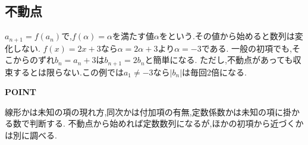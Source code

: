 \subsection{不動点}\label{節：不動点}
$a_{n+1}=f(a_n)$で,$f(\alpha)=\alpha$を満たす値$\alpha$を\textbf{}という.その値から始めると数列は変化しない.
$f(x)=2x+3$なら$\alpha=2\alpha+3$より$\alpha=-3$である.
一般の初項でも,そこからのずれ$b_n=a_n+3$は$b_{n+1}=2b_n$と簡単になる.
ただし,不動点があっても収束するとは限らない.この例では$a_1\ne-3$なら$|b_n|$は毎回2倍になる.

\begin{bookpoint}
  \textbf{POINT}\par
  線形かは未知の項の現れ方,同次かは付加項の有無,定数係数かは未知の項に掛かる数で判断する.
  不動点から始めれば定数数列になるが,ほかの初項から近づくかは別に調べる.
\end{bookpoint}
